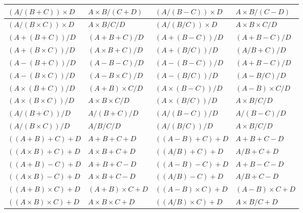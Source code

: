 \documentclass[11pt]{article}
\begin{document}
\begin{table}[htbp]
{\begin{tabular}{|l|l|l|l|}
$(A/(B+C)) \times D$ & $A \times B/(C+D)$ & $(A/(B-C)) \times D$ & $A \times B/(C-D)$  \\ \hline
$(A/(B \times C)) \times D$ & $A \times B/C/D$ & $(A/(B/C)) \times D$ & $A \times B \times C/D$  \\ \hline
$(A+(B+C))/D$ & $(A+B+C)/D$ & $(A+(B-C))/D$ & $(A+B-C)/D$  \\ \hline
$(A+(B \times C))/D$ & $(A \times B+C)/D$ & $(A+(B/C))/D$ & $(A/B+C)/D$  \\ \hline
$(A-(B+C))/D$ & $(A-B-C)/D$ & $(A-(B-C))/D$ & $(A+B-C)/D$  \\ \hline
$(A-(B \times C))/D$ & $(A-B \times C)/D$ & $(A-(B/C))/D$ & $(A-B/C)/D$  \\ \hline
$(A \times (B+C))/D$ & $(A+B) \times C/D$ & $(A \times (B-C))/D$ & $(A-B) \times C/D$  \\ \hline
$(A \times (B \times C))/D$ & $A \times B \times C/D$ & $(A \times (B/C))/D$ & $A \times B/C/D$  \\ \hline
$(A/(B+C))/D$ & $A/(B+C)/D$ & $(A/(B-C))/D$ & $A/(B-C)/D$  \\ \hline
$(A/(B \times C))/D$ & $A/B/C/D$ & $(A/(B/C))/D$ & $A \times B/C/D$  \\ \hline
$((A+B)+C)+D$ & $A+B+C+D$ & $((A-B)+C)+D$ & $A+B+C-D$  \\ \hline
$((A \times B)+C)+D$ & $A \times B+C+D$ & $((A/B)+C)+D$ & $A/B+C+D$  \\ \hline
$((A+B)-C)+D$ & $A+B+C-D$ & $((A-B)-C)+D$ & $A+B-C-D$  \\ \hline
$((A \times B)-C)+D$ & $A \times B+C-D$ & $((A/B)-C)+D$ & $A/B+C-D$  \\ \hline
$((A+B) \times C)+D$ & $(A+B) \times C+D$ & $((A-B) \times C)+D$ & $(A-B) \times C+D$  \\ \hline
$((A \times B) \times C)+D$ & $A \times B \times C+D$ & $((A/B) \times C)+D$ & $A \times B/C+D$  \\ \bottomrule
\end{tabular}
}
\end{table}
\end{document}
